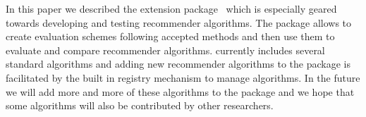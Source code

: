 \documentclass[nojss]{jss}
\begin{document}

%
In this paper we described the  
extension package~
which is especially geared towards developing and testing
recommender algorithms.
The package allows to create evaluation schemes following accepted 
methods and then use them to evaluate and compare recommender algorithms.
 currently includes several standard algorithms and
adding new recommender algorithms to the package is facilitated by the
built in registry mechanism to manage algorithms. 
%
In the future we will add more and more of these algorithms to the package and
we hope that some algorithms will also 
be contributed by other researchers.




\end{document}
